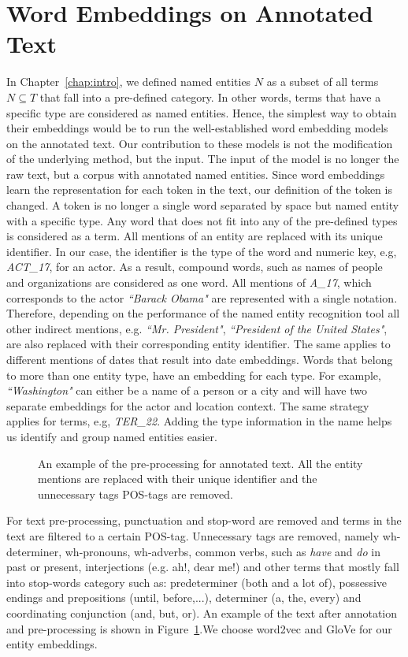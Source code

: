 \section{Word Embeddings on Annotated Text}\label{sec:annotated}
In Chapter~\ref{chap:intro}, we defined named entities $N$ as a subset of all terms $N\subseteq T$ that fall into a pre-defined category. In other words, terms that have a specific type are considered as named entities. Hence, the simplest way to obtain their embeddings would be to run the well-established word embedding models on the annotated text. Our contribution to these models is not the modification of the underlying method, but the input. The input of the model is no longer the raw text, but a corpus with annotated named entities. Since word embeddings learn the representation for each token in the text, our definition of the token is changed. A token is no longer a single word separated by space but named entity with a specific type. Any word that does not fit into any of the pre-defined types is considered as a term. All mentions of an entity are replaced with its unique identifier. In our case, the identifier is the type of the word and numeric key, e.g,  \emph{ACT\_17}, for an actor. As a result, compound words, such as names of people and organizations are considered as one word. All mentions of  \emph{A\_17}, which corresponds to the actor  \emph{``Barack Obama"} are represented with a single notation. Therefore, depending on the performance of the named entity recognition tool all other indirect mentions, e.g. \emph{``Mr. President"}, \emph{``President of the United States"}, are also replaced with their corresponding entity identifier. The same applies to different mentions of dates that result into date embeddings. Words that belong to more than one entity type, have an embedding for each type. For example, \emph{``Washington"} can either be a name of a person or a city and will have two separate embeddings for the actor and location context. The same strategy applies for terms, e.g,  \emph{TER\_22}.  Adding the type information in the name helps us identify and group named entities easier. \\
\begin{figure}
\centering 
\resizebox{0.85\textwidth}{0.28\textwidth}{      

}
\caption{An example of the pre-processing for annotated text. All the entity mentions are replaced with their unique identifier and the unnecessary tags POS-tags are removed. }
\label{fig:annotation}
\end{figure}
For text pre-processing, punctuation and stop-word are removed and terms in the text are filtered to a certain POS-tag. Unnecessary tags are removed, namely  wh-determiner, wh-pronouns, wh-adverbs, common verbs, such as  \emph{have} and  \emph{do} in past or present, interjections (e.g. ah!, dear me!) and other terms that mostly fall into stop-words category such as: predeterminer (both and a lot of), possessive endings and prepositions (until, before,...), determiner (a, the, every) and coordinating conjunction (and, but, or). An example of the text after annotation and pre-processing is shown in Figure~\ref{fig:annotation}.We choose word2vec and GloVe for our entity embeddings. 

